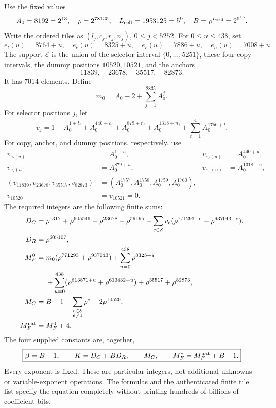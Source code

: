 Use the fixed values
\[
A_0=8192=2^{13},\quad \rho=2^{78125},\quad
L_{\rm cell}=1953125=5^9,\quad
B=\rho^{L_{\rm cell}}=2^{5^{16}}.
\]
Write the ordered tiles as $(l_j,c_j,r_j,n_j)$, $0\le j<5252$.
For $0\le u\le438$, set
\[
e_l(u)=8764+u,\quad e_c(u)=8325+u,\quad
e_r(u)=7886+u,\quad e_n(u)=7008+u.
\]
The support $\mathcal E$ is the union of the selector interval
$\{0,\ldots,5251\}$, these four copy intervals, the dummy positions
$10520,10521$, and the anchors
\[
11839,\quad23678,\quad35517,\quad82873.
\]
It has 7014 elements.  Define
\[
m_0=A_0-2+\sum_{j=1}^{2835}A_0^j.
\]
For selector positions $j$, let
\[
v_j=1+A_0^{1+l_j}+A_0^{440+c_j}+A_0^{879+r_j}
       +A_0^{1318+n_j}+\sum_{t=1}^4A_0^{1756+t}.
\]
For copy, anchor, and dummy positions, respectively, use
\begin{align*}
v_{e_l(u)}&=A_0^{1+u},&v_{e_c(u)}&=A_0^{440+u},\\
v_{e_r(u)}&=A_0^{879+u},&v_{e_n(u)}&=A_0^{1318+u},\\
(v_{11839},v_{23678},v_{35517},v_{82873})
  &=(A_0^{1757},A_0^{1758},A_0^{1759},A_0^{1760}),\\
v_{10520}&=v_{10521}=0.
\end{align*}
The required integers are the following finite sums:
\begin{align}
D_C={}&\rho^{1317}+\rho^{605546}+\rho^{23678}+\rho^{59195}
 +\sum_{e\in\mathcal E}v_e
       (\rho^{771293-e}+\rho^{937043-e}),\nonumber\\
D_R={}&\rho^{605107},\nonumber\\
M_F^0={}&m_0(\rho^{771293}+\rho^{937043})
       +\sum_{u=0}^{438}\rho^{8325+u}\nonumber\\
 &+\sum_{u=0}^{438}(\rho^{613871+u}+\rho^{613432+u})
       +\rho^{35517}+\rho^{82873},\label{eq:coefficientrecipe}\\
M_C={}&B-1-\sum_{\substack{e\in\mathcal E\\e\ne1}}\rho^e
       -2\rho^{10520},\nonumber\\
M_F^{\rm nat}={}&M_F^0+4.\nonumber
\end{align}
The four supplied constants are, together,
\begin{equation}
\boxed{\beta=B-1,\qquad K=D_C+BD_R,\qquad
M_C,\qquad M_F^*=M_F^{\rm nat}+B-1.}
\label{eq:ports}
\end{equation}
Every exponent is fixed.  These are particular integers, not additional
unknowns or variable-exponent operations.  The formulas and the
authenticated finite tile list specify the equation completely without
printing hundreds of billions of coefficient bits.

